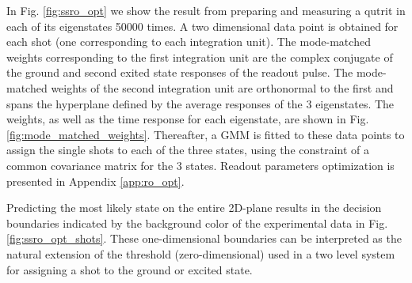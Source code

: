 In Fig. \ref{fig:ssro_opt} we show the result from preparing and measuring a qutrit in each of its eigenstates 50000 times. A two dimensional data point is obtained for each shot (one corresponding to each integration unit). The mode-matched weights corresponding to the first integration unit are the complex conjugate of the ground and second exited state responses of the readout pulse. The mode-matched weights of the second integration unit are orthonormal to the first and spans the hyperplane defined by the average responses of the 3 eigenstates. The weights, as well as the time response for each eigenstate, are shown in  Fig. \ref{fig:mode_matched_weights}. Thereafter, a GMM is fitted to these data points to assign the single shots to each of the three states, using the constraint of a common covariance matrix for the 3 states. Readout parameters optimization is presented in Appendix \ref{app:ro_opt}.

Predicting the most likely state on the entire 2D-plane results in the decision boundaries indicated by the background color of the experimental data in Fig. \ref{fig:ssro_opt_shots}. These one-dimensional boundaries can be interpreted as the natural extension of the threshold (zero-dimensional) used in a two level system for assigning a shot to the ground or excited state. 

